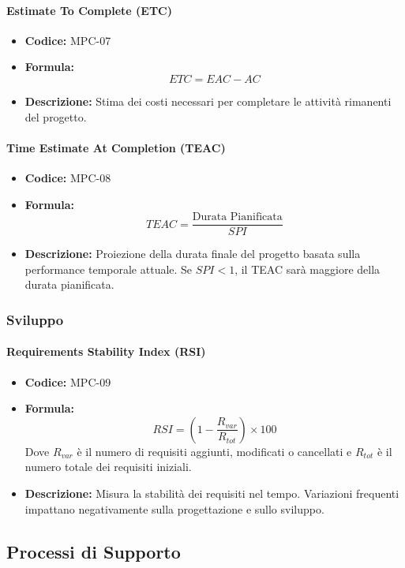 \documentclass[a4paper, 11pt]{article}
\begin{document}
\paragraph{Estimate To Complete (ETC)}
\begin{itemize}
    \item \textbf{Codice:} MPC-07 
    \item \textbf{Formula:} $$ETC = EAC - AC$$
    \item \textbf{Descrizione:} Stima dei costi necessari per completare le attività rimanenti del progetto.
\end{itemize}

\paragraph{Time Estimate At Completion (TEAC)}
\begin{itemize}
    \item \textbf{Codice:} MPC-08 
    \item \textbf{Formula:} $$TEAC = \frac{\text{Durata Pianificata}}{SPI}$$
    \item \textbf{Descrizione:} Proiezione della durata finale del progetto basata sulla performance temporale attuale. Se $SPI < 1$, il TEAC sarà maggiore della durata pianificata.
\end{itemize}

\subsubsection{Sviluppo}

\paragraph{Requirements Stability Index (RSI)}
\begin{itemize}
    \item \textbf{Codice:} MPC-09 
    \item \textbf{Formula:} $$RSI = \left( 1 - \frac{R_{var}}{R_{tot}} \right) \times 100$$
    Dove $R_{var}$ è il numero di requisiti aggiunti, modificati o cancellati e $R_{tot}$ è il numero totale dei requisiti iniziali.
    \item \textbf{Descrizione:} Misura la stabilità dei requisiti nel tempo. Variazioni frequenti impattano negativamente sulla progettazione e sullo sviluppo.
\end{itemize}

\subsection{Processi di Supporto}
\end{document}
